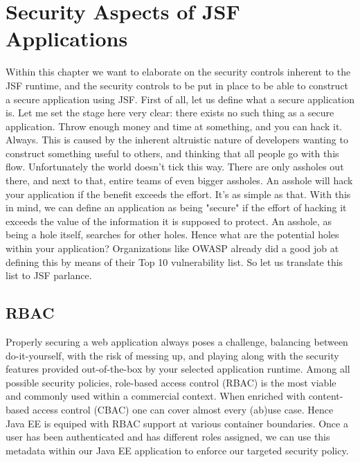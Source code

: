 %

\chapter{Security Aspects of JSF Applications}
Within this chapter we want to elaborate on the security controls inherent to the JSF runtime, and the security controls to be put in place to be able to construct a secure application using JSF.
First of all, let us define what a secure application is.
Let me set the stage here very clear: there exists no such thing as a secure application.
Throw enough money and time at something, and you can hack it.
Always.
This is caused by the inherent altruistic nature of developers wanting to construct something useful to others, and thinking that all people go with this flow.
Unfortunately the world doesn't tick this way.
There are only assholes out there, and next to that, entire teams of even bigger assholes.
An asshole will hack your application if the benefit exceeds the effort.
It's as simple as that.
With this in mind, we can define an application as being "secure" if the effort of hacking it exceeds the value of the information it is supposed to protect.
An asshole, as being a hole itself, searches for other holes.
Hence what are the potential holes within your application?
Organizations like OWASP already did a good job at defining this by means of their Top 10 vulnerability list.
So let us translate this list to JSF parlance.


\section{RBAC}
Properly securing a web application always poses a challenge,
balancing between do-it-yourself, with the risk of messing up,
and playing along with the security features provided out-of-the-box by your selected application runtime.
Among all possible security policies,
role-based access control (RBAC) is the most viable and commonly used within a commercial context.
When enriched with content-based access control (CBAC) one can cover almost every (ab)use case.
Hence Java EE is equiped with RBAC support at various container boundaries.
Once a user has been authenticated and has different roles assigned,
we can use this metadata within our Java EE application to enforce our targeted security policy.


